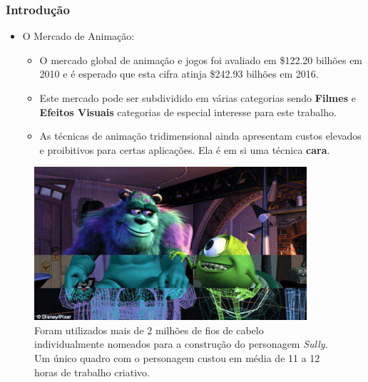 \documentclass[brazil]{beamer}
\begin{document}
\begin{frame}[fragile]
  \frametitle{Introdução}

  \begin{itemize}
      \item O Mercado de Animação:
      
      \begin{itemize}
      
        \item O mercado global de animação e jogos foi avaliado em \$122.20 bilhões em 2010 e é esperado que esta cifra atinja  \$242.93 bilhões em 2016.
        
        \item Este mercado pode ser subdividido em várias categorias sendo \textbf{Filmes} e \textbf{Efeitos Visuais} categorias de especial interesse para este trabalho.
        
        \item As técnicas de animação tridimensional ainda apresentam custos elevados e proibitivos para certas aplicações. Ela é em si uma técnica \textbf{cara}.
          
  \end{itemize} 
      
          
  \end{itemize}

\end{frame}
\begin{frame}
      \begin{figure}
        \centering
        \includegraphics[width = 0.9\textwidth, keepaspectratio]{./img/sully.jpg}
        \caption{Foram utilizados mais de 2 milhões de fios de cabelo individualmente nomeados para a construção do personagem \textit{Sully}. Um único quadro com o personagem custou em média de 11 a 12 horas de trabalho criativo.}
      \end{figure}
\end{frame}
\end{document}
